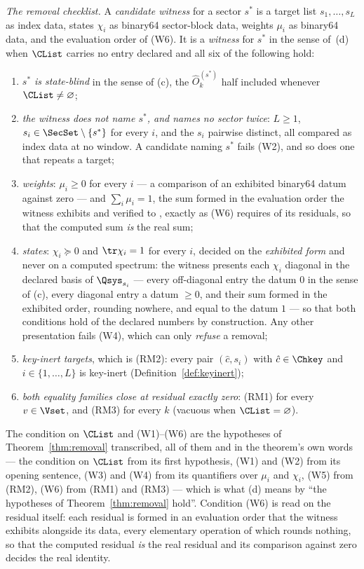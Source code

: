 \begin{definition}
\emph{The removal checklist.} A \emph{candidate witness} for a sector
$s^{*}$ is a target list $s_1,\dots,s_L$ as index data, states $\chi_i$ as
binary64 sector-block data, weights $\mu_i$ as binary64 data, and the
evaluation order of (W6). It is a \emph{witness} for $s^{*}$ in the sense
of~(d) when $\CList$ carries no entry declared  and all six
of the following hold:
\begin{enumerate}[label=(W\arabic*),leftmargin=3.0em]
\item \emph{$s^{*}$ is state-blind} in the sense of (c), the
$\hat O^{(s^{*})}_k$ half included whenever $\CList\neq\varnothing$;
\item \emph{the witness does not name $s^{*}$, and names no sector
twice}: $L\ge1$, $s_i\in\SecSet\setminus\{s^{*}\}$ for every $i$, and the
$s_i$ pairwise distinct, all compared as index data at
no window. A candidate naming $s^{*}$ fails (W2), and so does one that
repeats a target;
\item \emph{weights}: $\mu_i\ge0$ for every $i$ --- a comparison of an
exhibited binary64 datum against zero --- and $\sum_i\mu_i=1$, the sum
formed in the evaluation order the witness exhibits and verified to
, exactly as (W6) requires of its
residuals, so that the computed sum \emph{is} the real sum;
\item \emph{states}: $\chi_i\succeq0$ and $\tr\chi_i=1$ for every $i$,
decided on the \emph{exhibited form} and never on a computed spectrum:
the witness presents each $\chi_i$ diagonal in the declared basis of
$\Qsys_{s_i}$ --- every off-diagonal entry the datum $0$ in the sense of
(c), every diagonal entry a datum $\ge0$, and their sum formed in the
exhibited order, rounding nowhere, and equal to the datum $1$ --- so that
both conditions hold of the declared numbers by construction. Any other
presentation fails (W4), which can only \emph{refuse} a removal;
\item \emph{key-inert targets}, which is (RM2): every pair
$(\hat c,s_i)$ with $\hat c\in\Chkey$ and $i\in\{1,\dots,L\}$ is key-inert
(Definition~\ref{def:keyinert});
\item \emph{both equality families close at residual exactly zero}: (RM1)
for every $v\in\Vset$, and (RM3) for every $k$ (vacuous when
$\CList=\varnothing$).
\end{enumerate}
The condition on $\CList$ and (W1)--(W6) are the hypotheses of
Theorem~\ref{thm:removal} transcribed, all of them and in the theorem's own
words --- the condition on $\CList$ from its first hypothesis, (W1) and
(W2) from its opening sentence, (W3) and (W4) from its quantifiers over
$\mu_i$ and $\chi_i$, (W5) from (RM2), (W6) from (RM1) and (RM3) --- which
is what (d) means by ``the hypotheses of Theorem~\ref{thm:removal}
hold''.
Condition (W6) is read on the residual itself: each residual is formed in
an evaluation order that the witness exhibits alongside its data, every
elementary operation of which rounds nothing, so that the computed residual
\emph{is} the real residual and its comparison against zero decides the
real identity.


\end{definition}
